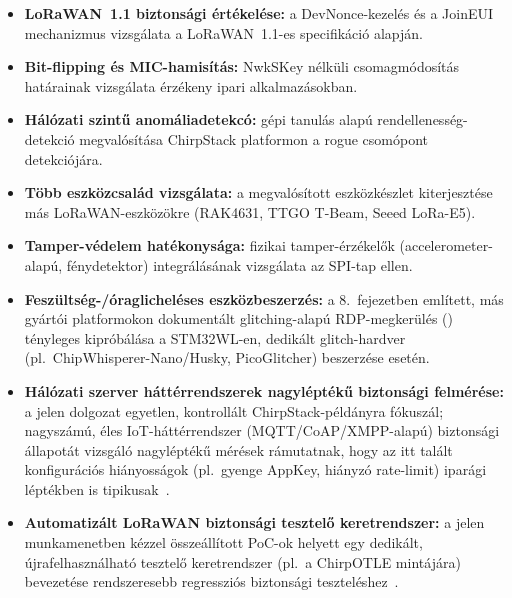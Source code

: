 \documentclass[12pt,a4paper]{article}
\begin{document}
\begin{itemize}
    \item \textbf{LoRaWAN~1.1 biztonsági értékelése:} a DevNonce-kezelés és
    a JoinEUI mechanizmus vizsgálata a LoRaWAN~1.1-es specifikáció alapján.
    \item \textbf{Bit-flipping és MIC-hamisítás:} NwkSKey nélküli csomagmódosítás
    határainak vizsgálata érzékeny ipari alkalmazásokban.
    \item \textbf{Hálózati szintű anomáliadetekcó:} gépi tanulás alapú
    rendellenesség-detekció megvalósítása ChirpStack platformon a rogue csomópont
    detekciójára.
    \item \textbf{Több eszközcsalád vizsgálata:} a megvalósított eszközkészlet
    kiterjesztése más LoRaWAN-eszközökre (RAK4631, TTGO T-Beam, Seeed LoRa-E5).
    \item \textbf{Tamper-védelem hatékonysága:} fizikai tamper-érzékelők
    (accelerometer-alapú, fénydetektor) integrálásának vizsgálata az SPI-tap ellen.
    \item \textbf{Feszültség-/óraglicheléses eszközbeszerzés:} a 8.\ fejezetben
    említett, más gyártói platformokon dokumentált glitching-alapú RDP-megkerülés
    (\cite{Kesenheimer2025, Secure2025, Soler2025}) tényleges kipróbálása a
    STM32WL-en, dedikált glitch-hardver (pl.\ ChipWhisperer-Nano/Husky,
    PicoGlitcher) beszerzése esetén.
    \item \textbf{Hálózati szerver háttérrendszerek nagyléptékű biztonsági
    felmérése:} a jelen dolgozat egyetlen, kontrollált ChirpStack-példányra
    fókuszál; nagyszámú, éles IoT-háttérrendszer (MQTT/CoAP/XMPP-alapú)
    biztonsági állapotát vizsgáló nagyléptékű mérések rámutatnak, hogy az
    itt talált konfigurációs hiányosságok (pl.\ gyenge AppKey, hiányzó
    rate-limit) iparági léptékben is tipikusak~\cite{Tagliaro2024}.
    \item \textbf{Automatizált LoRaWAN biztonsági tesztelő keretrendszer:} a
    jelen munkamenetben kézzel összeállított PoC-ok helyett egy dedikált,
    újrafelhasználható tesztelő keretrendszer (pl.\ a ChirpOTLE mintájára)
    bevezetése rendszeresebb regressziós biztonsági teszteléshez~\cite{Hessel2020}.
\end{itemize}

\newpage


\end{document}
